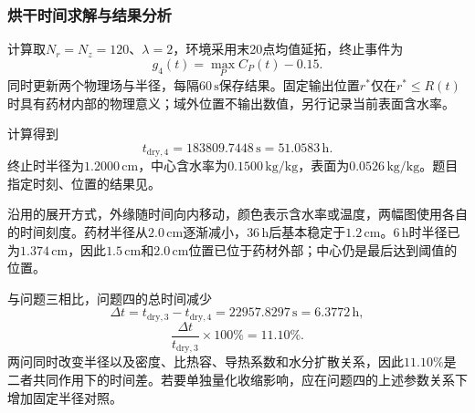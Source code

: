 \subsubsection{烘干时间求解与结果分析}
计算取$N_r=N_z=120$、$\lambda=2$，环境采用末20点均值延拓，终止事件为
\begin{equation}
g_4(t)=\max_P C_P(t)-0.15.
\end{equation}
同时更新两个物理场与半径，每隔$60\,\mathrm{s}$保存结果。固定输出位置$r^\ast$仅在$r^\ast\le R(t)$时具有药材内部的物理意义；域外位置不输出数值，另行记录当前表面含水率。

计算得到
\begin{equation}\label{eq:q4-time}
t_{\mathrm{dry},4}
=183809.7448\,\mathrm{s}
=51.0583\,\mathrm{h}.
\end{equation}
终止时半径为$1.2000\,\mathrm{cm}$，中心含水率为$0.1500\,\mathrm{kg/kg}$，表面为$0.0526\,\mathrm{kg/kg}$。题目指定时刻、位置的结果见。


沿用的展开方式，外缘随时间向内移动，颜色表示含水率或温度，两幅图使用各自的时间刻度。药材半径从$2.0\,\mathrm{cm}$逐渐减小，$36\,\mathrm{h}$后基本稳定于$1.2\,\mathrm{cm}$。$6\,\mathrm{h}$时半径已为$1.374\,\mathrm{cm}$，因此$1.5\,\mathrm{cm}$和$2.0\,\mathrm{cm}$位置已位于药材外部；中心仍是最后达到阈值的位置。

与问题三相比，问题四的总时间减少
\begin{equation}
\Delta t=t_{\mathrm{dry},3}-t_{\mathrm{dry},4}
=22957.8297\,\mathrm{s}=6.3772\,\mathrm{h},
\end{equation}
\begin{equation}
\frac{\Delta t}{t_{\mathrm{dry},3}}\times100\%=11.10\%.
\end{equation}
两问同时改变半径以及密度、比热容、导热系数和水分扩散关系，因此$11.10\%$是二者共同作用下的时间差。若要单独量化收缩影响，应在问题四的上述参数关系下增加固定半径对照。
\endgroup
